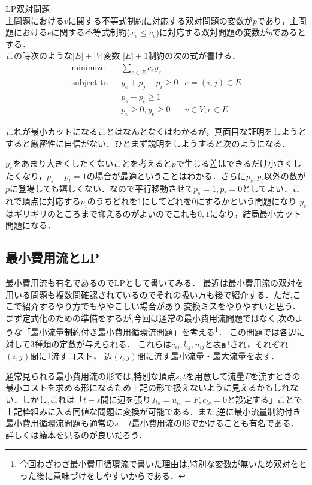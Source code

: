 \documentclass[13pt]{jarticle}
\theoremstyle{nonitalic} %
\begin{document}
LP双対問題 \\
主問題における$v$に関する不等式制約に対応する双対問題の変数が$p$であり，主問題における$e$に関する不等式制約($x_e \leq c_e$)に対応する双対問題の変数が$y$であるとする．\\
この時次のような$|E|+|V|$変数 $|E|+1$制約の次の式が書ける．
\begin{align}
 &&&&&\textrm{minimize}   && \sum_{e \in E} c_e y_e  \\
 &&&&&\textrm{subject to} && y_e + p_j - p_i \geq 0 &  e = (i, j) \in E  &&&&&\\
 &&&&&                    && p_s - p_t  \geq 1         &&&&& \\
 &&&&&                    && p_v \geq 0,  y_e \geq 0 &  v \in V, e \in E &&&&&
\end{align}

これが最小カットになることはなんとなくはわかるが，真面目な証明をしようとすると厳密性に自信がない．ひとまず説明をしようすると次のようになる．

$y_e$をあまり大きくしたくないことを考えると$p$で生じる差はできるだけ小さくしたくなり，$p_s-p_t=1$の場合が最適ということはわかる．さらに$p_s, p_t$以外の数が$p$に登場しても嬉しくない．なので平行移動させて$p_s=1, p_t=0$としてよい．これで頂点に対応する$p_i$のうちどれを1にしてどれを$0$にするかという問題になり $y_e$ はギリギリのところまで抑えるのがよいのでこれも$0,1$になり，結局最小カット問題になる．


\subsection{最小費用流とLP}
\label{sec:mcf}
最小費用流も有名であるのでLPとして書いてみる． 
最近は最小費用流の双対を用いる問題も複数問確認されているのでそれの扱い方も後で紹介する．ただ,ここで紹介するやり方でもややこしい場合があり,変換ミスをやりやすいと思う． \\


まず定式化のための準備をするが,今回は通常の最小費用流問題ではなく,次のような「最小流量制約付き最小費用循環流問題」を考える\footnote{今回わざわざ最小費用循環流で書いた理由は,特別な変数が無いため双対をとった後に意味づけをしやすいからである．}．
この問題では各辺に対して3種類の定数が与えられる． これらは$c_{ij}, l_{ij}, u_{ij}$と表記され，それぞれ $(i,j)$間に1流すコスト， 辺$(i,j)$間に流す最小流量・最大流量を表す． 

通常見られる最小費用流の形では,特別な頂点$s,t$を用意して流量$F$を流すときの最小コストを求める形になるため上記の形で扱えないように見えるかもしれない．しかし,これは「$t-s$間に辺を張り,$l_{ts}=u_{ts} = F, c_{ts}=0$と設定する」ことで上記枠組みに入る同値な問題に変換が可能である．また,逆に最小流量制約付き最小費用循環流問題も通常の$s-t$最小費用流の形でかけることも有名である．詳しくは蟻本を見るのが良いだろう．
\end{document}
